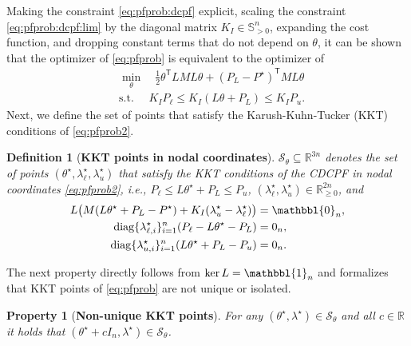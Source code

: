 \documentclass[twocolumn,twoside,journal]{IEEEtran}
\DeclareMathOperator{\diag}{diag}
\newtheorem{definition}{Definition}
\newtheorem{property}{Property}
\begin{document}
Making the constraint \eqref{eq:pfprob:dcpf} explicit, scaling the constraint \eqref{eq:pfprob:dcpf:lim} by the diagonal matrix $K_I \in \mathbb{S}^n_{>0}$, expanding the cost function, and dropping constant terms that do not depend on $\theta$, it can be shown that the optimizer of \eqref{eq:pfprob} is equivalent to the optimizer of
\begin{subequations}\label{eq:pfprob2}
    \begin{align}
        &\min_{\theta} \quad \tfrac{1}{2} \theta^\mathsf{T} L M L \theta +  (P_L-P^\star)^\mathsf{T} M L \theta  \\
        & \text {s.t. } \quad  K_I P_\ell \leq K_I (L \theta + P_L) \leq K_I P_u.
        \end{align}
\end{subequations}
%
Next, we define the set of points that satisfy the Karush-Kuhn-Tucker (KKT) conditions of \eqref{eq:pfprob2}. 
%
\begin{definition}[\textbf{KKT points in nodal coordinates}]\label{def:stheta}
$\mathcal{S}_{\theta} \subseteq \mathbb{R}^{3n}$ denotes the set of points $(\theta^\star,\lambda^\star_\ell,\lambda^\star_u)$ that satisfy the KKT conditions of the CDCPF in nodal coordinates \eqref{eq:pfprob2}, i.e., $P_\ell \leq L \theta^\star + P_L \leq P_u$, $(\lambda^\star_\ell,\lambda^\star_u) \in \mathbb{R}^{2n}_{\geq 0}$, and 
\begin{subequations}\label{eq:KKT:nodal}
\begin{align}
    L \big(M (L \theta^\star + P_L-P^\star) + K_I (\lambda^\star_u-\lambda^\star_\ell)\big) &= \mathbbl{0}_n,\label{eq:KKT:nodal:optimality}\\
    \diag\{\lambda^\star_{\ell,i}\}_{i=1}^n (P_\ell - L \theta^\star - P_L)&=0_n,\\
    \diag\{\lambda^\star_{u,i}\}_{i=1}^n (L \theta^\star + P_L - P_u)&=0_n.
\end{align}
\end{subequations}
\end{definition}
The next property directly follows from $\ker L = \mathbbl{1}_n$ and formalizes that KKT points of \eqref{eq:pfprob} are not unique or isolated.
\begin{property}[\textbf{Non-unique KKT points}]\label{property:stheta}
    For any $\left(\theta^\star, \lambda^\star\right) \in \mathcal{S}_{\theta}$ and all $c \in \mathbb{R}$ it holds that $\left(\theta^\star + cI_n, \lambda^\star\right) \in \mathcal{S}_{\theta}$.
\end{property}
\end{document}
